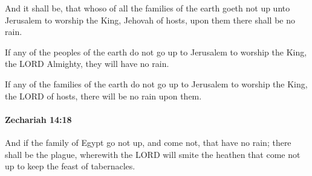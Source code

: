 			\begin{versebox}
					\item[BHS] 
					\item[LXX] 
					\item[ASV] And it shall be, that whoso of all the families of the earth goeth not up unto Jerusalem to worship the King, Jehovah of hosts, upon them there shall be no rain.
					\item[NIV] If any of the peoples of the earth do not go up to Jerusalem to worship the King, the LORD Almighty, they will have no rain.
					\item[NRSV] If any of the families of the earth do not go up to Jerusalem to worship the King, the LORD of hosts, there will be no rain upon them.
			\end{versebox}

		\paragraph{Zechariah 14:18} %
			\label{ZECHARIAH-14-18}

			And if the family of Egypt go not up, and come not, that have no rain; there shall be the plague, wherewith the LORD will smite the heathen that come not up to keep the feast of tabernacles.

